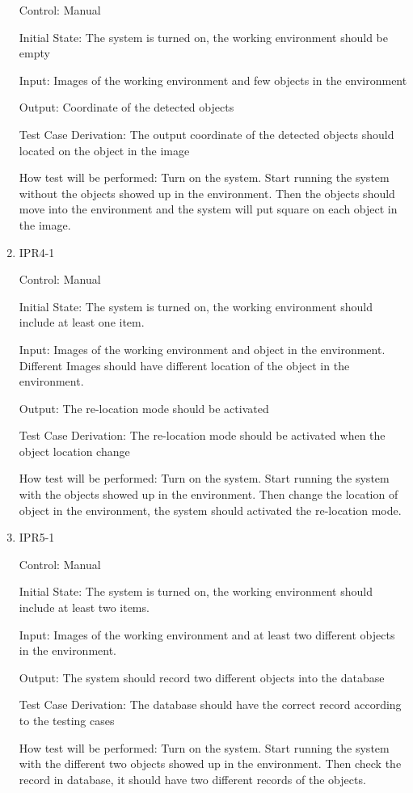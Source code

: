 \documentclass[12pt, titlepage]{article}
\begin{document}
\begin{enumerate}
Control: Manual
					
Initial State: The system is turned on, the working environment should be empty
					
Input: Images of the working environment and few objects in the environment
					
Output: Coordinate of the detected objects

Test Case Derivation: The output coordinate of the detected objects should located on the object in the image
					
How test will be performed: Turn on the system. Start running the system without the objects showed up in the environment. Then the objects should move into the environment and the system will put square on each object in the image.


\item{IPR4-1\\}

Control: Manual
					
Initial State: The system is turned on, the working environment should include at least one item.
					
Input: Images of the working environment and object in the environment. Different Images should have different location of the object in the environment.
					
Output: The re-location mode should be activated

Test Case Derivation: The re-location mode should be activated when the object location change
					
How test will be performed: Turn on the system. Start running the system with the objects showed up in the environment. Then change the location of object in the environment, the system should activated the re-location mode.


\item{IPR5-1\\}

Control: Manual
					
Initial State: The system is turned on, the working environment should include at least two items.
					
Input: Images of the working environment and at least two different objects in the environment. 
					
Output: The system should record two different objects into the database

Test Case Derivation: The database should have the correct record according to the testing cases
					
How test will be performed: Turn on the system. Start running the system with the different two objects showed up in the environment. Then check the record in database, it should have two different records of the objects.

				

\end{enumerate}
\end{document}
